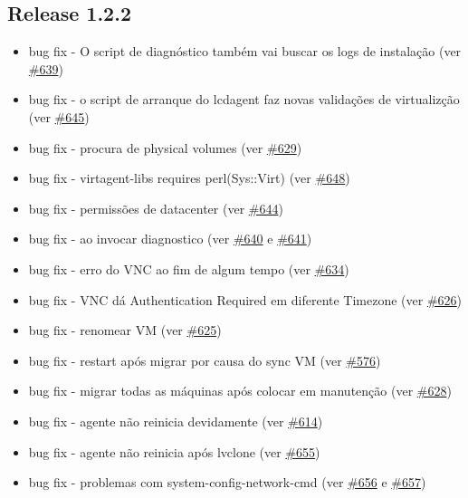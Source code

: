 \subsection{Release 1.2.2}
\begin{itemize}
    \item bug fix - O script de diagnóstico também vai buscar os logs de instalação (ver \href{https://srcmaster.eurotux.com/pm/p/etva/ticket/639}{\#639})
    \item bug fix - o script de arranque do lcdagent faz novas validações de virtualizção (ver \href{https://srcmaster.eurotux.com/pm/p/etva/ticket/645}{\#645})
    \item bug fix - procura de physical volumes (ver \href{https://srcmaster.eurotux.com/pm/p/etva/ticket/629}{\#629})
    \item bug fix - virtagent-libs requires perl(Sys::Virt) (ver \href{https://srcmaster.eurotux.com/pm/p/etva/ticket/648}{\#648})
    \item bug fix - permissões de datacenter (ver \href{https://srcmaster.eurotux.com/pm/p/etva/ticket/644}{\#644})
    \item bug fix - ao invocar diagnostico (ver \href{https://srcmaster.eurotux.com/pm/p/etva/ticket/640}{\#640} e \href{https://srcmaster.eurotux.com/pm/p/etva/ticket/641}{\#641})
    \item bug fix - erro do VNC ao fim de algum tempo (ver \href{https://srcmaster.eurotux.com/pm/p/etva/ticket/634}{\#634})
    \item bug fix - VNC dá Authentication Required em diferente Timezone (ver \href{https://srcmaster.eurotux.com/pm/p/etva/ticket/626}{\#626})
    \item bug fix - renomear VM (ver \href{https://srcmaster.eurotux.com/pm/p/etva/ticket/625}{\#625})
    \item bug fix - restart após migrar por causa do sync VM (ver \href{https://srcmaster.eurotux.com/pm/p/etva/ticket/576}{\#576})
    \item bug fix - migrar todas as máquinas após colocar em manutenção (ver \href{https://srcmaster.eurotux.com/pm/p/etva/ticket/628}{\#628})
    \item bug fix - agente não reinicia devidamente (ver \href{https://srcmaster.eurotux.com/pm/p/etva/ticket/614}{\#614})
    \item bug fix - agente não reinicia após lvclone (ver \href{https://srcmaster.eurotux.com/pm/p/etva/ticket/655}{\#655})
    \item bug fix - problemas com system-config-network-cmd (ver \href{https://srcmaster.eurotux.com/pm/p/etva/ticket/656}{\#656} e \href{https://srcmaster.eurotux.com/pm/p/etva/ticket/657}{\#657})

\end{itemize}
